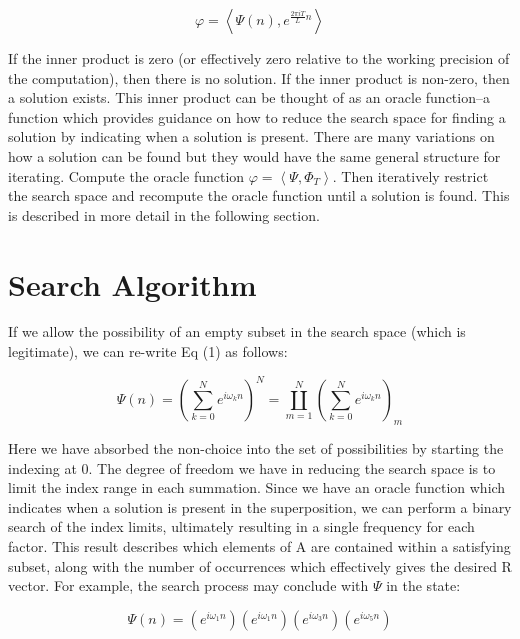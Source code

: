 \documentclass[reqno]{amsart}
\theoremstyle{definition}
\theoremstyle{remark}
\begin{document}
\begin{equation}
\varphi  =  \left \langle \Psi (n), e^{  \frac{2\pi i T}{L} n }\right \rangle  
\end{equation}

If the inner product is zero (or effectively zero relative to the working precision of the computation), then there is no solution. If the inner product is non-zero, then a solution exists. This inner product can be thought of as an oracle function--a function which provides guidance on how to reduce the search space for finding a solution by indicating when a solution is present. There are many variations on how a solution can be found but they would have the same general structure for iterating. Compute the oracle function $\varphi  =  \left \langle \Psi, \Phi _T\right \rangle $. Then iteratively restrict the search space and recompute the oracle function until a solution is found. This is described in more detail in the following section.

\newpage
\section{Search Algorithm}
If we allow the possibility of an empty subset in the search space (which is legitimate), we can re-write Eq (1) as follows:

\begin{equation}
\Psi (n) = \left (\sum_{k=0}^{N}e^{i\omega _k n} \right )^{N} = \coprod_{m=1}^{N} \left (  \sum_{k=0}^{N} e^{i \omega _k n}  \right ) _m
\end{equation}

Here we have absorbed the non-choice into the set of possibilities by starting the indexing at 0. The degree of freedom we have in reducing the search space is to limit the index range in each summation. Since we have an oracle function which indicates when a solution is present in the superposition, we can perform a binary search of the index limits, ultimately resulting in a single frequency for each factor. This result describes which elements of A are contained within a satisfying subset, along with the number of occurrences which effectively gives the desired R vector. For example, the search process may conclude with $\Psi$ in the state:

\begin{equation}
\Psi (n) = \left (e^{i\omega _1 n} \right ) \left (e^{i\omega _1 n} \right ) \left (e^{i\omega _3 n} \right ) \left (e^{i\omega _5 n} \right )
\end{equation}
\end{document}
